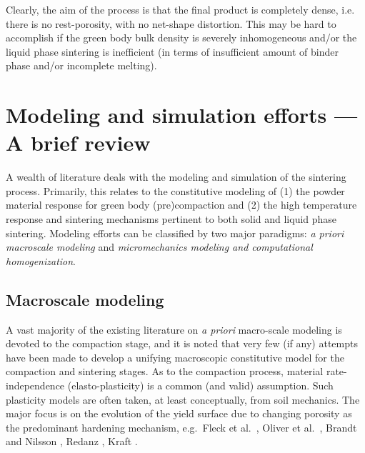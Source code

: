 \documentclass[MikaelDissertation.tex]{subfiles}
\begin{document}


Clearly, the aim of the process is that the final product is completely dense, i.e. there is no rest-porosity, with no net-shape distortion.
This may be hard to accomplish if the green body bulk density is severely inhomogeneous and/or the liquid phase sintering is inefficient (in terms of insufficient amount of binder phase and/or incomplete melting).

\section{Modeling and simulation efforts --- A brief review}

A wealth of literature deals with the modeling and simulation of the sintering process.
Primarily, this relates to the constitutive modeling of
(1) the powder material response for green body (pre)compaction and 
(2) the high temperature response and sintering mechanisms pertinent to both solid and liquid phase sintering.
Modeling efforts can be classified by two major paradigms: \emph{a priori macroscale modeling} and \emph{micromechanics modeling and computational homogenization}.

\subsection{Macroscale modeling}

A vast majority of the existing literature on \emph{a priori} macro-scale modeling is devoted to the compaction stage, and it is noted that very few (if any) attempts have been made to develop a unifying macroscopic constitutive model for the compaction and sintering stages.
As to the compaction process, material rate-independence (elasto-plasticity) is a common (and valid) assumption.
Such plasticity models are often taken, at least conceptually, from soil mechanics.
The major focus is on the evolution of the yield surface due to changing porosity as the predominant hardening mechanism, e.g.\ Fleck et al.\ \cite{fleck_yielding_1992},
Oliver et al.\ \cite{oliver_plasticity_1996}, Brandt and Nilsson \cite{brandt_fe-simulation_1998}, Redanz \cite{redanz_numerical_1998}, Kraft \cite{kraft_optimizing_2003}.
\end{document}
